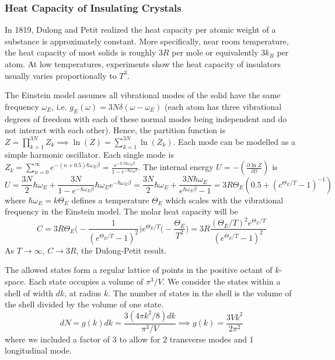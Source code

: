 \documentclass[a4paper]{article}
\begin{document}
\subsubsection*{Heat Capacity of Insulating Crystals}
\begin{Note}
In 1819, Dulong and Petit realized the heat capacity per atomic weight of a substance is approximately constant. More specifically, near room temperature, the heat capacity of most solids is roughly $3R$ per mole or equivalently $3k_B$ per atom. At low temperatures, experiments show the heat capacity of insulators usually varies proportionally to $T^3$.
\end{Note}
\begin{Note}
The Einstein model assumes all vibrational modes of the solid have the same frequency $\omega_E$, i.e. $g_E(\omega)=3N\delta(\omega-\omega_E)$ (each atom has three vibrational degrees of freedom with each of these normal modes being independent and do not interact with each other). Hence, the partition function is $Z=\prod_{k=1}^{3N}Z_k\implies\ln(Z)=\sum_{k=1}^{3N}\ln(Z_k)$. Each mode can be modelled as a simple harmonic oscillator. Each single mode is $Z_k=\sum_{n=0}^\infty e^{-(n+0.5)\hbar\omega_E\beta}=\frac{e^{-0.5\hbar\omega_E\beta}}{1-e^{-\hbar\omega_E\beta}}$. The internal energy $U=-(\frac{\partial\ln Z}{\partial\beta})$ is
$$U=\frac{3N}{2}\hbar\omega_E+\frac{3N}{1-e^{-\hbar\omega_E\beta}}\hbar\omega_Ee^{-\hbar\omega_E\beta}=\frac{3N}{2}\hbar\omega_E+\frac{3N\hbar\omega_E}{e^{\hbar\omega_E\beta}-1}=3R\Theta_E(0.5+(e^{\Theta_E/T}-1)^{-1})$$
where $\hbar\omega_E=k\Theta_E$ defines a temperature $\Theta_E$ which scales with the vibrational frequency in the Einstein model. The molar heat capacity will be
$$C=3R\Theta_E\bigg(-\frac{1}{(e^{\Theta_E/T}-1)^2}\bigg)e^{\Theta_E/T}\bigg(-\frac{\Theta_E}{T^2}\bigg)=3R\frac{(\Theta_E/T)^2e^{\Theta_E/T}}{(e^{\Theta_E/T}-1)^2}$$
As $T\rightarrow\infty$, $C\rightarrow 3R$, the Dulong-Petit result.
\end{Note}
\begin{Note}
The allowed states form a regular lattice of points in the positive octant of $k$-space. Each state occupies a volume of $\pi^3/V$. We consider the states within a shell of width $dk$, at radius $k$. The number of states in the shell is the volume of the shell divided by the volume of one state.
$$dN=g(k)dk=\frac{3(4\pi k^2/8)dk}{\pi^3/V}\implies g(k)=\frac{3Vk^2}{2\pi^2}$$
where we included a factor of 3 to allow for 2 transverse modes and 1 longitudinal mode.
\end{Note}
\end{document}
